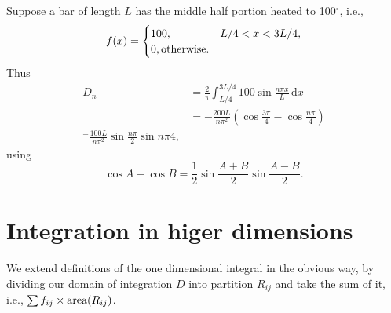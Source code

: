 \documentclass[letter-paper]{tufte-book}
\newenvironment{example}[1][Example]{\begin{trivlist}
\item[\hskip \labelsep {\bfseries #1}]}{\end{trivlist}}
\begin{document}
\begin{example}
  Suppose a bar of length $L$ has the middle half portion heated to 100$^\circ$,
  i.e.,
  \begin{equation*}
    f(x) = \begin{cases}100, & L/4 < x < 3L/4,\\ 0, \textnormal{otherwise}.
    \end{cases}
  \end{equation*}
  Thus
  \begin{align*}
    D_n &= \frac{2}{\pi} \int_{L/4}^{3L/4} 100\sin\frac{n\pi x}{L}\, \mathrm{d}x \\
      &= -\frac{200L}{n\pi^2}\left(\cos\frac{3\pi}{4} - \cos\frac{n\pi}{4}\right)\\
      ^= \frac{100 L}{n\pi^2}\sin\frac{n\pi}{2}\sin{n\pi}{4},
  \end{align*}
  using
  \begin{equation*}
    \cos A - \cos B = \frac{1}{2}\sin\frac{A+B}{2}\sin\frac{A-B}{2}.
  \end{equation*}
\end{example}


\chapter{Integration in higer dimensions}

We extend definitions of the one dimensional integral in the obvious way, by
dividing our domain of integration $D$ into partition $R_{ij}$ and take the sum
of it, i.e., $\sum f_{ij} \times \textnormal{area}(R_{ij})$.
\end{document}
